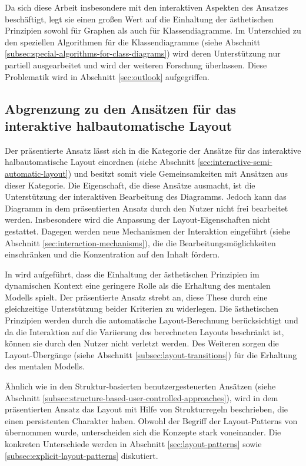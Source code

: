 Da sich diese Arbeit insbesondere mit den interaktiven Aspekten des Ansatzes beschäftigt, legt sie einen großen Wert auf die Einhaltung der ästhetischen Prinzipien sowohl für Graphen als auch für Klassendiagramme. Im Unterschied zu den speziellen Algorithmen für die Klassendiagramme (siehe Abschnitt \ref{subsec:special-algorithms-for-class-diagrams}) wird deren Unterstützung nur partiell ausgearbeitet und wird der weiteren Forschung überlassen. Diese Problematik wird in Abschnitt \ref{sec:outlook} aufgegriffen.

\subsection{Abgrenzung zu den Ansätzen für das interaktive halbautomatische Layout}
\label{subsec:comparison-interactive-layout}

Der präsentierte Ansatz lässt sich in die Kategorie der Ansätze für das interaktive halbautomatische Layout einordnen (siehe Abschnitt \ref{sec:interactive-semi-automatic-layout}) und besitzt somit viele Gemeinsamkeiten mit Ansätzen aus dieser Kategorie. Die Eigenschaft, die diese Ansätze ausmacht, ist die Unterstützung der interaktiven Bearbeitung des Diagramms. Jedoch kann das Diagramm in dem präsentierten Ansatz durch den Nutzer nicht frei bearbeitet werden. Insbesondere wird die Anpassung der Layout-Eigenschaften nicht gestattet. Dagegen werden neue Mechanismen der Interaktion eingeführt (siehe Abschnitt \ref{sec:interaction-mechanisms}), die die Bearbeitungsmöglichkeiten einschränken und die Konzentration auf den Inhalt fördern.

In \cite[S.5]{Maier12A-Pattern-based} wird aufgeführt, dass die Einhaltung der ästhetischen Prinzipien im dynamischen Kontext eine geringere Rolle als die Erhaltung des mentalen Modells spielt. Der präsentierte Ansatz strebt an, diese These durch eine gleichzeitige Unterstützung beider Kriterien zu widerlegen. Die ästhetischen Prinzipien werden durch die automatische Layout-Berechnung berücksichtigt und da die Interaktion auf die Variierung des berechneten Layouts beschränkt ist, können sie durch den Nutzer nicht verletzt werden. Des Weiteren sorgen die Layout-Übergänge (siehe Abschnitt \ref{subsec:layout-transitions}) für die Erhaltung des mentalen Modells.

Ähnlich wie in den Struktur-basierten benutzergesteuerten Ansätzen (siehe Abschnitt \ref{subsec:structure-based-user-controlled-approaches}), wird in dem präsentierten Ansatz das Layout mit Hilfe von Strukturregeln beschrieben, die einen persistenten Charakter haben. Obwohl der Begriff der Layout-Patterns von \cite{Maier12A-Pattern-based} übernommen wurde, unterscheiden sich die Konzepte stark voneinander. Die konkreten Unterschiede werden in Abschnitt \ref{sec:layout-patterns} sowie \ref{subsec:explicit-layout-patterns} diskutiert.

